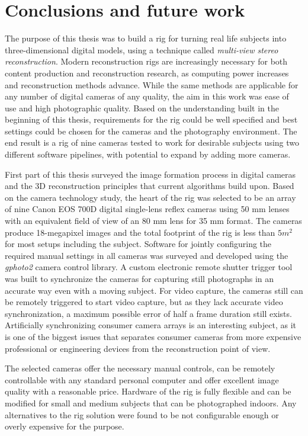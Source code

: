 \section{Conclusions and future work} \label{sec:conclusion}

The purpose of this thesis was to build a rig for turning real life subjects into three-dimensional digital models, using a technique called \emph{multi-view stereo reconstruction}.
Modern reconstruction rigs are increasingly necessary for both content production and reconstruction research, as computing power increases and reconstruction methods advance.
While the same methods are applicable for any number of digital cameras of any quality, the aim in this work was ease of use and high photographic quality.
Based on the understanding built in the beginning of this thesis, requirements for the rig could be well specified and best settings could be chosen for the cameras and the photography environment.
The end result is a rig of nine cameras tested to work for desirable subjects using two different software pipelines, with potential to expand by adding more cameras.

First part of this thesis surveyed the image formation process in digital cameras and the 3D reconstruction principles that current algorithms build upon.
Based on the camera technology study, the heart of the rig was selected to be an array of nine Canon EOS 700D digital single-lens reflex cameras using 50 mm lenses with an equivalent field of view of an 80 mm lens for 35 mm format.
The cameras produce 18-megapixel images and the total footprint of the rig is less than $5 m^2$ for most setups including the subject.
Software for jointly configuring the required manual settings in all cameras was surveyed and developed using the \emph{gphoto2} camera control library.
A custom electronic remote shutter trigger tool was built to synchronize the cameras for capturing still photographs in an accurate way even with a moving subject.
For video capture, the cameras still can be remotely triggered to start video capture, but as they lack accurate video synchronization, a maximum possible error of half a frame duration still exists.
Artificially synchronizing consumer camera arrays is an interesting subject, as it is one of the biggest issues that separates consumer cameras from more expensive professional or engineering devices from the reconstruction point of view.

The selected cameras offer the necessary manual controls, can be remotely controllable with any standard personal computer and offer excellent image quality with a reasonable price.
Hardware of the rig is fully flexible and can be modified for small and medium subjects that can be photographed indoors.
Any alternatives to the rig solution were found to be not configurable enough or overly expensive for the purpose.

